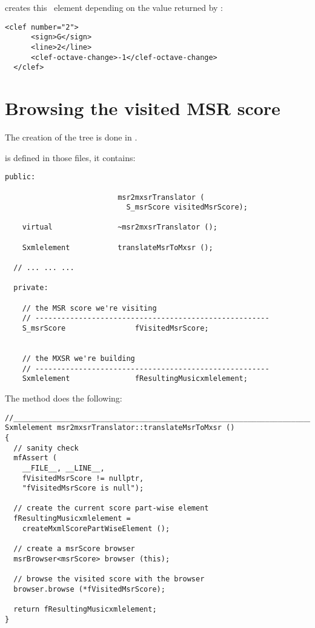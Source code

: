 creates this \mxml\ element depending on the value returned by :
\begin{lstlisting}[language=MusicXML]
 <clef number="2">
      <sign>G</sign>
      <line>2</line>
      <clef-octave-change>-1</clef-octave-change>
  </clef>

\end{lstlisting}

\section{Browsing the visited MSR score}

The creation of the tree is done in .

 is defined in those files, it contains:
\begin{lstlisting}[language=CPlusPlus]
  public:

                          msr2mxsrTranslator (
                            S_msrScore visitedMsrScore);

    virtual               ~msr2mxsrTranslator ();

    Sxmlelement           translateMsrToMxsr ();

  // ... ... ...

  private:

    // the MSR score we're visiting
    // ------------------------------------------------------
    S_msrScore                fVisitedMsrScore;


    // the MXSR we're building
    // ------------------------------------------------------
    Sxmlelement               fResultingMusicxmlelement;
\end{lstlisting}

The  method does the following:
\begin{lstlisting}[language=CPlusPlus]
//________________________________________________________________________
Sxmlelement msr2mxsrTranslator::translateMsrToMxsr ()
{
  // sanity check
  mfAssert (
    __FILE__, __LINE__,
    fVisitedMsrScore != nullptr,
    "fVisitedMsrScore is null");

  // create the current score part-wise element
  fResultingMusicxmlelement =
    createMxmlScorePartWiseElement ();

  // create a msrScore browser
  msrBrowser<msrScore> browser (this);

  // browse the visited score with the browser
  browser.browse (*fVisitedMsrScore);

  return fResultingMusicxmlelement;
}
\end{lstlisting}


